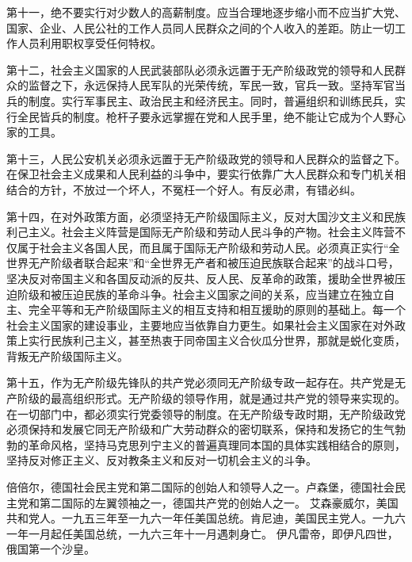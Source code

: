 第十一，绝不要实行对少数人的高薪制度。应当合理地逐步缩小而不应当扩大党、国家、企业、人民公社的工作人员同人民群众之间的个人收入的差距。防止一切工作人员利用职权享受任何特权。

第十二，社会主义国家的人民武装部队必须永远置于无产阶级政党的领导和人民群众的监督之下，永远保持人民军队的光荣传统，军民一致，官兵一致。坚持军官当兵的制度。实行军事民主、政治民主和经济民主。同时，普遍组织和训练民兵，实行全民皆兵的制度。枪杆子要永远掌握在党和人民手里，绝不能让它成为个人野心家的工具。

第十三，人民公安机关必须永远置于无产阶级政党的领导和人民群众的监督之下。在保卫社会主义成果和人民利益的斗争中，要实行依靠广大人民群众和专门机关相结合的方针，不放过一个坏人，不冤枉一个好人。有反必肃，有错必纠。

第十四，在对外政策方面，必须坚持无产阶级国际主义，反对大国沙文主义和民族利己主义。社会主义阵营是国际无产阶级和劳动人民斗争的产物。社会主义阵营不仅属于社会主义各国人民，而且属于国际无产阶级和劳动人民。必须真正实行“全世界无产阶级者联合起来”和“全世界无产者和被压迫民族联合起来”的战斗口号，坚决反对帝国主义和各国反动派的反共、反人民、反革命的政策，援助全世界被压迫阶级和被压迫民族的革命斗争。社会主义国家之间的关系，应当建立在独立自主、完全平等和无产阶级国际主义的相互支持和相互援助的原则的基础上。每一个社会主义国家的建设事业，主要地应当依靠自力更生。如果社会主义国家在对外政策上实行民族利己主义，甚至热衷于同帝国主义合伙瓜分世界，那就是蜕化变质，背叛无产阶级国际主义。

第十五，作为无产阶级先锋队的共产党必须同无产阶级专政一起存在。共产党是无产阶级的最高组织形式。无产阶级的领导作用，就是通过共产党的领导来实现的。在一切部门中，都必须实行党委领导的制度。在无产阶级专政时期，无产阶级政党必须保持和发展它同无产阶级和广大劳动群众的密切联系，保持和发扬它的生气勃勃的革命风格，坚持马克思列宁主义的普遍真理同本国的具体实践相结合的原则，坚持反对修正主义、反对教条主义和反对一切机会主义的斗争。


\begin{maonote}
倍倍尔，德国社会民主党和第二国际的创始人和领导人之一。卢森堡，德国社会民主党和第二国际的左翼领袖之一，德国共产党的创始人之一。
艾森豪威尔，美国共和党人。一九五三年至一九六一年任美国总统。肯尼迪，美国民主党人。一九六一年一月起任美国总统，一九六三年十一月遇刺身亡。
伊凡雷帝，即伊凡四世，俄国第一个沙皇。
\end{maonote}
